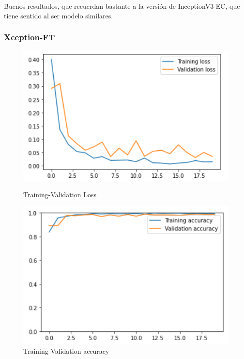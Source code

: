 \documentclass[11pt,a4paper]{article}
\theoremstyle{definition}
\begin{document}
Buenos resultados, que recuerdan bastante a la versión de InceptionV3-EC, que tiene sentido al ser modelo similares.\\

\subsubsection{Xception-FT}

\begin{figure}[H]
  \centering
  \begin{minipage}[b]{0.45\textwidth}
    \includegraphics[scale=0.75]{./images/xception2aloss}
	\caption{Training-Validation Loss}
  \end{minipage}
  \hfill
  \begin{minipage}[b]{0.45\textwidth}
    \includegraphics[scale=0.75]{./images/xception2acc}
	\caption{Training-Validation accuracy}
  \end{minipage}
\end{figure}
\end{document}
